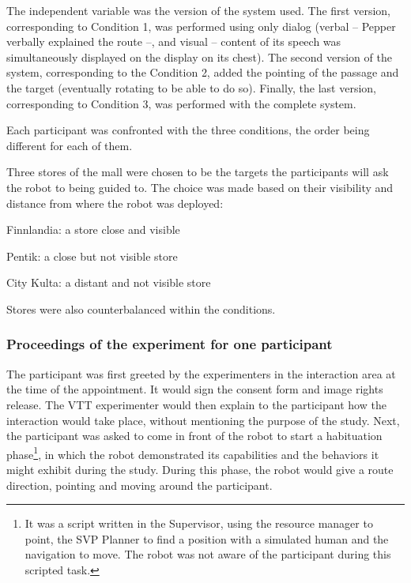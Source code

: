 \documentclass[a4paper,11pt,twoside]{StyleThese}
\begin{document}
The independent variable was the version of the system used. The first version, corresponding to Condition 1, was performed using only dialog (verbal -- Pepper verbally explained the route --, and visual -- content of its speech was simultaneously displayed on the display on its chest). The second version of the system, corresponding to the Condition 2, added the pointing of the passage and the target (eventually rotating to be able to do so). Finally, the last version, corresponding to Condition 3, was performed with the complete system. 

Each participant was confronted with the three conditions, the order being different for each of them.

Three stores of the mall were chosen to be the targets the participants will ask the robot to being guided to. The choice was made based on their visibility and distance from where the robot was deployed: 
\begin{bulletList}
	\item Finnlandia: a store close and visible 
	\item Pentik: a close but not visible store
	\item City Kulta: a distant and not visible store
\end{bulletList}

Stores were also counterbalanced within the conditions.

\subsubsection*{Proceedings of the experiment for one participant}

The participant was first greeted by the experimenters in the interaction area at the time of the appointment. It would sign the consent form and image rights release. The VTT experimenter would then explain to the participant how the interaction would take place, without mentioning the purpose of the study. Next, the participant was asked to come in front of the robot to start a habituation phase\footnote{It was a script written in the Supervisor, using the resource manager to point, the SVP Planner to find a position with a simulated human and the navigation to move. The robot was not aware of the participant during this scripted task.}, in which the robot demonstrated its capabilities and the behaviors it might exhibit during the study. During this phase, the robot would give a route direction, pointing and moving around the participant. 
\end{document}
